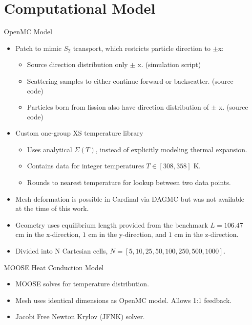 \documentclass[9pt,t,aspectratio=169]{beamer}
\begin{document}
\section{Computational Model}
\begin{frame}{OpenMC Model}
    \pause
    \begin{itemize}
        \item <2-> Patch to mimic $S_{2}$ transport, which restricts particle direction to $\pm$x:
        \begin{itemize}
            \item <3-> Source direction distribution only $\pm$ x. (simulation script)
            \item <4-> Scattering samples to either continue forward or backscatter. (source code)
            \item <5-> Particles born from fission also have direction distribution of $\pm$ x. (source code)
        \end{itemize}
        \item <6-> Custom one-group XS temperature library
        \begin{itemize}
            \item <7-> Uses analytical $\Sigma(T)$, instead of explicitly modeling thermal expansion.
            \item <8-> Contains data for integer temperatures $T\in[308,358]$ K.
            \item <9-> Rounds to nearest temperature for lookup between two data points.
        \end{itemize}
        \item <10-> Mesh deformation is possible in Cardinal via DAGMC \cite{novak-2023} but was not available at the time of this work.
        \item <11-> Geometry uses equilibrium length provided from the benchmark $L=106.47$ cm in the x-direction, $1$ cm in the y-direction, and $1$ cm in the z-direction.
        \item <12-> Divided into N Cartesian cells, $N=[5, 10, 25, 50, 100, 250, 500, 1000]$.
    \end{itemize}
\end{frame}

\begin{frame}{MOOSE Heat Conduction Model}
    \pause
    \begin{itemize}
        \item <2-> MOOSE solves for temperature distribution.
        \item <3-> Mesh uses identical dimensions as OpenMC model. Allows 1:1 feedback.
        \item <4-> Jacobi Free Newton Krylov (JFNK) solver.
    \end{itemize}
\end{frame}
\end{document}
